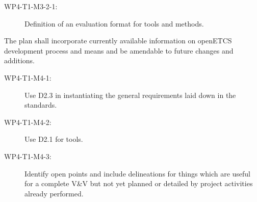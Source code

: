 \documentclass{template/openetcs_report}
\begin{document}
{\begin{description}
\begin{description}
  \item[WP4-T1-M3-2-1:] Definition of an evaluation format for tools
    and methods.
  \end{description}
\item[WP4-T1-G4:] The plan shall incorporate currently available
  information on openETCS development process and means and be
  amendable to future changes and additions.
  \begin{description}
  \item[WP4-T1-M4-1:] Use D2.3 in instantiating the general
    requirements laid down in the standards.
  \item[WP4-T1-M4-2:] Use D2.1 for tools.
  \item[WP4-T1-M4-3:] Identify open points and include delineations
    for things which are useful for a complete V\&V but not yet
    planned or detailed by project activities already performed.
  \end{description}
\end{description}
}
\end{document}
